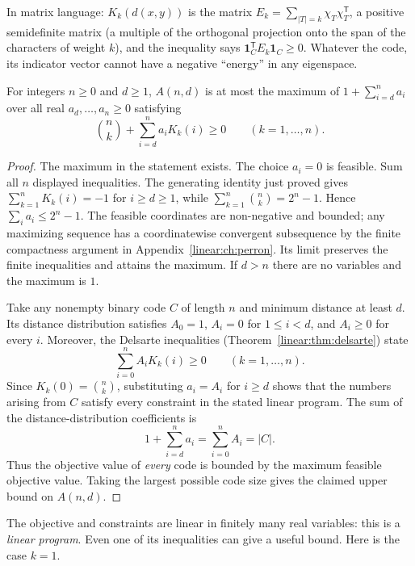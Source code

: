 In matrix language: $K_k(d(x,y))$ is the matrix $E_k=\sum_{|T|=k}\chi_T\chi_T^{\mathsf T}$, a positive semidefinite matrix (a multiple of
the orthogonal projection onto the span of the characters of weight $k$), and the inequality says $\mathbf 1_C^{\mathsf T}E_k\mathbf
1_C\ge0$. Whatever the code, its indicator vector cannot have a negative ``energy'' in any eigenspace.

\begin{corollary}\label{linear:cor:lp}
For integers $n\ge0$ and $d\ge1$, $A(n,d)$ is at most the maximum of
$1+\sum_{i=d}^na_i$ over all real $a_d,\dots,a_n\ge0$ satisfying
\[
\binom nk+\sum_{i=d}^na_iK_k(i)\ge0\qquad(k=1,\dots,n).
\]
\end{corollary}
\begin{proof}
The maximum in the statement exists. The choice $a_i=0$ is feasible.
Sum all $n$ displayed inequalities. The generating identity just proved gives
$\sum_{k=1}^nK_k(i)=-1$ for $i\ge d\ge1$, while
$\sum_{k=1}^n\binom nk=2^n-1$. Hence $\sum_i a_i\le2^n-1$.
The feasible coordinates are non-negative and bounded; any maximizing sequence
has a coordinatewise convergent subsequence by the finite compactness argument
in Appendix~\ref{linear:ch:perron}. Its limit preserves the finite inequalities
and attains the maximum. If $d>n$ there are no variables and the maximum is $1$.

Take any nonempty binary code $C$ of length $n$
and minimum distance at least $d$.
Its distance distribution satisfies
$A_0=1$, $A_i=0$ for $1\le i<d$,
and $A_i\ge0$ for every $i$.
Moreover, the Delsarte inequalities
(Theorem~\ref{linear:thm:delsarte}) state
\[
\sum_{i=0}^n A_iK_k(i)\ge0
\qquad (k=1,\ldots,n).
\]
Since $K_k(0)=\binom nk$, substituting
$a_i=A_i$ for $i\ge d$ shows that the
numbers arising from $C$ satisfy every
constraint in the stated linear program.
The sum of the distance-distribution
coefficients is
\[
1+\sum_{i=d}^n a_i
=\sum_{i=0}^nA_i=|C|.
\]
Thus the objective value of \emph{every}
code is bounded by the maximum feasible
objective value. Taking the largest
possible code size gives the claimed
upper bound on $A(n,d)$.
\end{proof}

The objective and constraints are linear in finitely many real variables:
this is a \emph{linear program}. Even one of its inequalities can give a
useful bound. Here is the case $k=1$.

